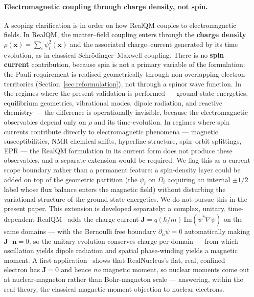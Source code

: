 \documentclass[11pt]{article}
\begin{document}
\paragraph{Electromagnetic coupling through charge density, not spin.}
A scoping clarification is in order on how RealQM couples to electromagnetic fields. In RealQM, the matter--field coupling enters through the \textbf{charge density} $\rho(\mathbf{x}) = \sum_i \psi_i^2(\mathbf{x})$ and the associated charge--current generated by its time evolution, as in classical Schr\"odinger--Maxwell coupling. There is no \textbf{spin current} contribution, because spin is not a primary variable of the formulation: the Pauli requirement is realised geometrically through non-overlapping electron territories (Section~\ref{sec:reformulation}), not through a spinor wave function. In the regimes where the present validation is performed --- ground-state energetics, equilibrium geometries, vibrational modes, dipole radiation, and reactive chemistry --- the difference is operationally invisible, because the electromagnetic observables depend only on $\rho$ and its time-evolution. In regimes where spin currents contribute directly to electromagnetic phenomena --- magnetic susceptibilities, NMR chemical shifts, hyperfine structure, spin--orbit splittings, EPR --- the RealQM formulation in its current form does not produce these observables, and a separate extension would be required. We flag this as a current scope boundary rather than a permanent feature: a spin-density layer could be added on top of the geometric partition (the $\psi_i$ on $\Omega_i$ acquiring an internal $\pm 1/2$ label whose flux balance enters the magnetic field) without disturbing the variational structure of the ground-state energetics. We do not pursue this in the present paper. This extension is developed separately: a complex, unitary, time-dependent RealQM~\cite{ComplexRealQM} adds the charge current $\mathbf{J}=q(\hbar/m)\,\mathrm{Im}(\psi^*\nabla\psi)$ on the same domains --- with the Bernoulli free boundary $\partial_n\psi=0$ automatically making $\mathbf{J}\cdot\mathbf{n}=0$, so the unitary evolution conserves charge per domain --- from which oscillation yields dipole radiation and spatial phase-winding yields a magnetic moment. A first application~\cite{NuclearMoment} shows that RealNucleus's flat, real, confined electron has $\mathbf{J}=0$ and hence \emph{no} magnetic moment, so nuclear moments come out at nuclear-magneton rather than Bohr-magneton scale --- answering, within the real theory, the classical magnetic-moment objection to nuclear electrons.
\end{document}
